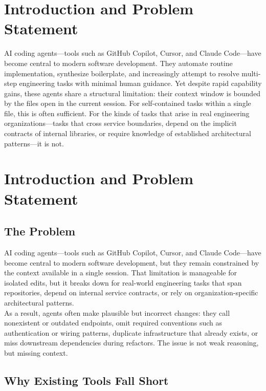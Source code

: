 \documentclass[a4paper,12pt]{article}
\begin{document}
\section{Introduction and Problem Statement}

AI coding agents—tools such as GitHub Copilot, Cursor, and Claude Code—have
become central to modern software development.
They automate routine implementation, synthesize boilerplate, and increasingly
attempt to resolve multi-step engineering tasks with minimal human guidance.
Yet despite rapid capability gains, these agents share a structural limitation:
their context window is bounded by the files open in the current session.
For self-contained tasks within a single file, this is often sufficient.
For the kinds of tasks that arise in real engineering organizations—tasks that
cross service boundaries, depend on the implicit contracts of internal libraries,
or require knowledge of established architectural patterns—it is not.

\section{Introduction and Problem Statement}


\subsection{The Problem}

AI coding agents—tools such as GitHub Copilot, Cursor, and Claude Code—have
become central to modern software development, but they remain constrained by
the context available in a single session.
That limitation is manageable for isolated edits, but it breaks down for
real-world engineering tasks that span repositories, depend on internal service
contracts, or rely on organization-specific architectural patterns. \\

As a result, agents often make plausible but incorrect changes: they call
nonexistent or outdated endpoints, omit required conventions such as
authentication or wiring patterns, duplicate infrastructure that already exists,
or miss downstream dependencies during refactors.
The issue is not weak reasoning, but missing context.

\subsection{Why Existing Tools Fall Short}
\end{document}
